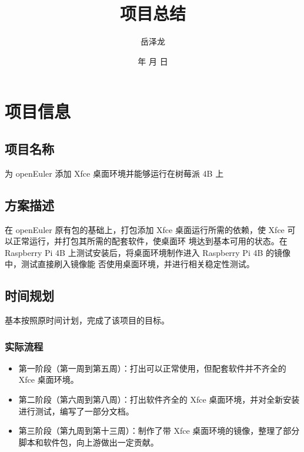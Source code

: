 \documentclass[letterpaper,12pt]{article}
\renewcommand{\today}{\number\year 年 \number\month 月 \number\day 日}
\begin{document}
\onehalfspacing
\title{项目总结}
\author{岳泽龙}
\date{\today}
\maketitle

\section{项目信息}

\subsection{项目名称}
    为 openEuler 添加 Xfce 桌面环境并能够运行在树莓派 4B 上

\subsection{方案描述}
    在 openEuler 原有包的基础上，打包添加 Xfce 桌面运行所需的依赖，使 Xfce 可以正常运行，并打包其所需的配套软件，使桌面环
    境达到基本可用的状态。在 Raspberry Pi 4B 上测试安装后，将桌面环境制作进入 Raspberry Pi 4B 的镜像中，测试直接刷入镜像能
    否使用桌面环境，并进行相关稳定性测试。

\subsection{时间规划}
基本按照原时间计划，完成了该项目的目标。

\subsubsection{实际流程}
\begin{itemize}
    \item 第一阶段（第一周到第五周）：打出可以正常使用，但配套软件并不齐全的 Xfce 桌面环境。
    \item 第二阶段（第六周到第八周）：打出软件齐全的 Xfce 桌面环境，并对全新安装进行测试，编写了一部分文档。
    \item 第三阶段（第九周到第十三周）：制作了带 Xfce 桌面环境的镜像，整理了部分脚本和软件包，向上游做出一定贡献。
\end{itemize}
\end{document}
